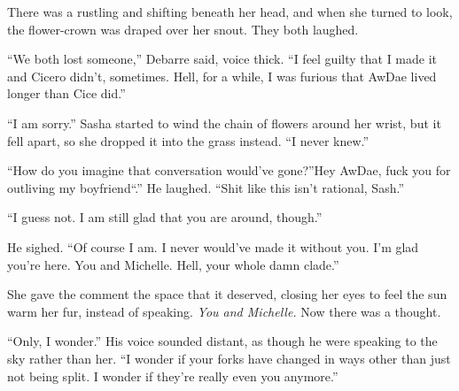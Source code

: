 There was a rustling and shifting beneath her head, and when she turned to look, the flower-crown was draped over her snout. They both laughed.

``We both lost someone,'' Debarre said, voice thick. ``I feel guilty that I made it and Cicero didn't, sometimes. Hell, for a while, I was furious that AwDae lived longer than Cice did.''

``I am sorry.'' Sasha started to wind the chain of flowers around her wrist, but it fell apart, so she dropped it into the grass instead. ``I never knew.''

``How do you imagine that conversation would've gone?''Hey AwDae, fuck you for outliving my boyfriend``.'' He laughed. ``Shit like this isn't rational, Sash.''

``I guess not. I am still glad that you are around, though.''

He sighed. ``Of course I am. I never would've made it without you. I'm glad you're here. You and Michelle. Hell, your whole damn clade.''

She gave the comment the space that it deserved, closing her eyes to feel the sun warm her fur, instead of speaking. \emph{You and Michelle.} Now there was a thought.

``Only, I wonder.'' His voice sounded distant, as though he were speaking to the sky rather than her. ``I wonder if your forks have changed in ways other than just not being split. I wonder if they're really even you anymore.''
